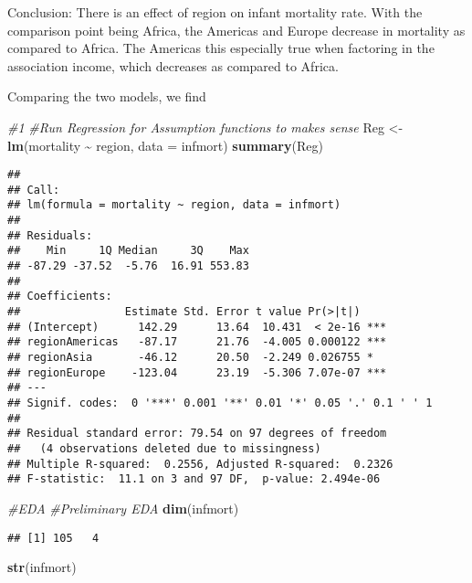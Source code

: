 \documentclass[
]{article}
\newenvironment{Shaded}{\begin{snugshade}}{\end{snugshade}}
\newcommand{\AttributeTok}[1]{\textcolor[rgb]{0.13,0.29,0.53}{#1}}
\newcommand{\CommentTok}[1]{\textcolor[rgb]{0.56,0.35,0.01}{\textit{#1}}}
\newcommand{\FunctionTok}[1]{\textcolor[rgb]{0.13,0.29,0.53}{\textbf{#1}}}
\newcommand{\NormalTok}[1]{#1}
\newcommand{\OtherTok}[1]{\textcolor[rgb]{0.56,0.35,0.01}{#1}}
\newcommand{\SpecialCharTok}[1]{\textcolor[rgb]{0.81,0.36,0.00}{\textbf{#1}}}
\begin{document}
Conclusion: There is an effect of region on infant mortality rate. With
the comparison point being Africa, the Americas and Europe decrease in
mortality as compared to Africa. The Americas this especially true when
factoring in the association income, which decreases as compared to
Africa.

Comparing the two models, we find

\begin{Shaded}
\begin{Highlighting}[]
\CommentTok{\#1}
\CommentTok{\#Run Regression for Assumption functions to makes sense}
\NormalTok{Reg }\OtherTok{\textless{}{-}} \FunctionTok{lm}\NormalTok{(mortality }\SpecialCharTok{\textasciitilde{}}\NormalTok{ region, }\AttributeTok{data =}\NormalTok{ infmort)}
\FunctionTok{summary}\NormalTok{(Reg)}
\end{Highlighting}
\end{Shaded}

\begin{verbatim}
## 
## Call:
## lm(formula = mortality ~ region, data = infmort)
## 
## Residuals:
##    Min     1Q Median     3Q    Max 
## -87.29 -37.52  -5.76  16.91 553.83 
## 
## Coefficients:
##                Estimate Std. Error t value Pr(>|t|)    
## (Intercept)      142.29      13.64  10.431  < 2e-16 ***
## regionAmericas   -87.17      21.76  -4.005 0.000122 ***
## regionAsia       -46.12      20.50  -2.249 0.026755 *  
## regionEurope    -123.04      23.19  -5.306 7.07e-07 ***
## ---
## Signif. codes:  0 '***' 0.001 '**' 0.01 '*' 0.05 '.' 0.1 ' ' 1
## 
## Residual standard error: 79.54 on 97 degrees of freedom
##   (4 observations deleted due to missingness)
## Multiple R-squared:  0.2556, Adjusted R-squared:  0.2326 
## F-statistic:  11.1 on 3 and 97 DF,  p-value: 2.494e-06
\end{verbatim}

\begin{Shaded}
\begin{Highlighting}[]
\CommentTok{\#EDA}
  \CommentTok{\#Preliminary EDA}
  \FunctionTok{dim}\NormalTok{(infmort)}
\end{Highlighting}
\end{Shaded}

\begin{verbatim}
## [1] 105   4
\end{verbatim}

\begin{Shaded}
\begin{Highlighting}[]
  \FunctionTok{str}\NormalTok{(infmort)}
\end{Highlighting}
\end{Shaded}
\end{document}
